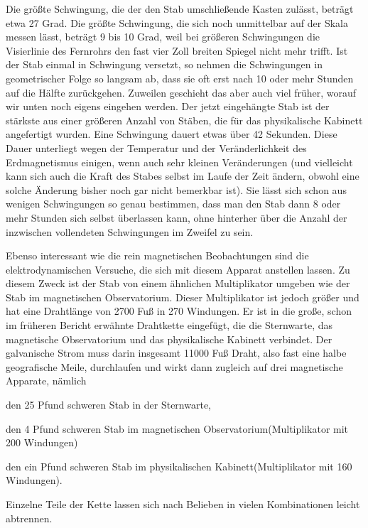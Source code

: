 Die größte Schwingung, die der den Stab umschließende Kasten zulässt, beträgt etwa 27 Grad. Die größte Schwingung, die sich noch unmittelbar auf der Skala messen lässt, beträgt 9 bis 10 Grad, weil bei größeren Schwingungen die Visierlinie des Fernrohrs den fast vier Zoll breiten Spiegel nicht mehr trifft. Ist der Stab einmal in Schwingung versetzt, so nehmen die Schwingungen in geometrischer Folge so langsam ab, dass sie oft erst nach 10 oder mehr Stunden auf die Hälfte zurückgehen. Zuweilen geschieht das aber auch viel früher, worauf wir unten noch eigens eingehen werden. Der jetzt eingehängte Stab ist der stärkste aus einer größeren Anzahl von Stäben, die für das physikalische Kabinett angefertigt wurden. Eine Schwingung dauert etwas über 42 Sekunden. Diese Dauer unterliegt wegen der Temperatur und der Veränderlichkeit des Erdmagnetismus einigen, wenn auch sehr kleinen Veränderungen (und vielleicht kann sich auch die Kraft des Stabes selbst im Laufe der Zeit ändern, obwohl eine solche Änderung bisher noch gar nicht bemerkbar ist). Sie lässt sich schon aus wenigen Schwingungen so genau bestimmen, dass man den Stab dann 8 oder mehr Stunden sich selbst überlassen kann, ohne hinterher über die Anzahl der inzwischen vollendeten Schwingungen im Zweifel zu sein.

Ebenso interessant wie die rein magnetischen Beobachtungen sind die elektrodynamischen Versuche, die sich mit diesem Apparat anstellen lassen. Zu diesem Zweck ist der Stab von einem ähnlichen Multiplikator umgeben wie der Stab im magnetischen Observatorium. Dieser Multiplikator ist jedoch größer und hat eine Drahtlänge von 2700 Fuß in 270 Windungen. Er ist in die große, schon im früheren Bericht erwähnte Drahtkette eingefügt, die die Sternwarte, das magnetische Observatorium und das physikalische Kabinett verbindet. Der galvanische Strom muss darin insgesamt 11000 Fuß Draht, also fast eine halbe geografische Meile, durchlaufen und wirkt dann zugleich auf drei magnetische Apparate, nämlich
\begin{list}{}{\setlength{\leftmargin}{2em}\setlength{\labelwidth}{2em}\setlength{\itemsep}{0pt}\setlength{\parsep}{0pt}}
\item[I.] den 25 Pfund schweren Stab in der Sternwarte,
\item[II.] den 4 Pfund schweren Stab im magnetischen Observatorium\newline (Multiplikator mit 200 Windungen)
\item[III.] den ein Pfund schweren Stab im physikalischen Kabinett\newline (Multiplikator mit 160 Windungen).
\end{list}
\noindent Einzelne Teile der Kette lassen sich nach Belieben in vielen Kombinationen leicht abtrennen.

